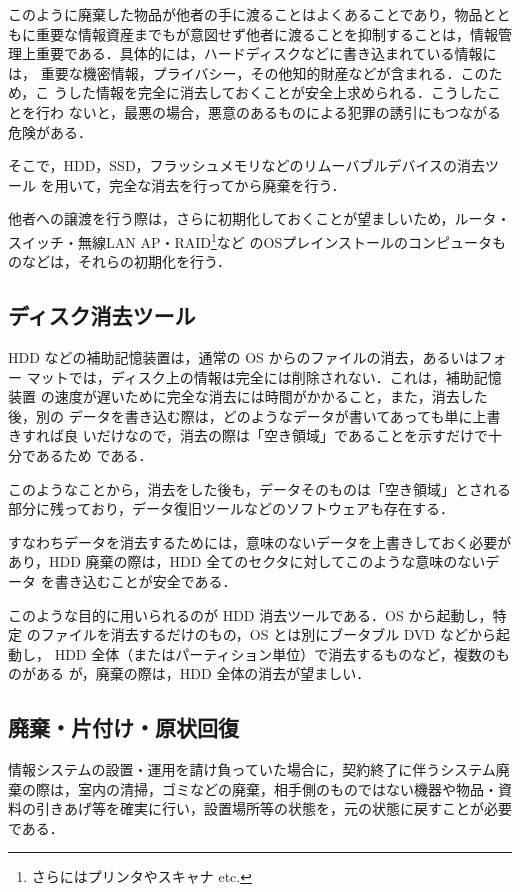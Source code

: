 このように廃棄した物品が他者の手に渡ることはよくあることであり，物品とと
もに重要な情報資産までもが意図せず他者に渡ることを抑制することは，情報管
理上重要である．具体的には，ハードディスクなどに書き込まれている情報には，
重要な機密情報，プライバシー，その他知的財産などが含まれる．このため，こ
うした情報を完全に消去しておくことが安全上求められる．こうしたことを行わ
ないと，最悪の場合，悪意のあるものによる犯罪の誘引にもつながる危険がある．

そこで，HDD，SSD，フラッシュメモリなどのリムーバブルデバイスの消去ツール
を用いて，完全な消去を行ってから廃棄を行う．

他者への譲渡を行う際は，さらに初期化しておくことが望ましいため，ルータ・
スイッチ・無線LAN AP・RAID\footnote{さらにはプリンタやスキャナ etc.}など
のOSプレインストールのコンピュータものなどは，それらの初期化を行う．


\subsection*{ディスク消去ツール}

HDD などの補助記憶装置は，通常の OS からのファイルの消去，あるいはフォー
マットでは，ディスク上の情報は完全には削除されない．これは，補助記憶装置
の速度が遅いために完全な消去には時間がかかること，また，消去した後，別の
データを書き込む際は，どのようなデータが書いてあっても単に上書きすれば良
いだけなので，消去の際は「空き領域」であることを示すだけで十分であるため
である．

このようなことから，消去をした後も，データそのものは「空き領域」とされる
部分に残っており，データ復旧ツールなどのソフトウェアも存在する．

すなわちデータを消去するためには，意味のないデータを上書きしておく必要が
あり，HDD 廃棄の際は，HDD 全てのセクタに対してこのような意味のないデータ
を書き込むことが安全である．

このような目的に用いられるのが HDD 消去ツールである．OS から起動し，特定
のファイルを消去するだけのもの，OS とは別にブータブル DVD などから起動し，
HDD 全体（またはパーティション単位）で消去するものなど，複数のものがある
が，廃棄の際は，HDD 全体の消去が望ましい．

\subsection*{廃棄・片付け・原状回復}

情報システムの設置・運用を請け負っていた場合に，契約終了に伴うシステム廃
棄の際は，室内の清掃，ゴミなどの廃棄，相手側のものではない機器や物品・資
料の引きあげ等を確実に行い，設置場所等の状態を，元の状態に戻すことが必要
である．


